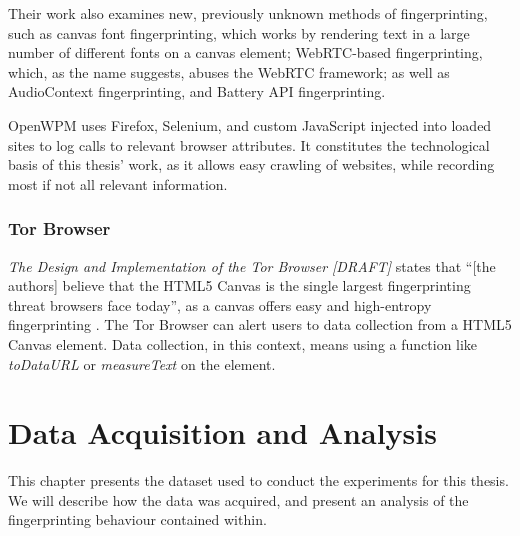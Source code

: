 \documentclass[
    fontsize=12pt,
    headings=small,
    parskip=half,
    bibliography=totoc,
    numbers=noenddot,
    open=any
    ]{scrreprt}
\begin{document}
Their work also examines new, previously unknown methods of fingerprinting, such as canvas font fingerprinting, which
works by rendering text in a large number of different fonts on a canvas element; WebRTC-based fingerprinting, which,
as the name suggests, abuses the WebRTC framework; as well as AudioContext fingerprinting, and Battery API fingerprinting.

OpenWPM uses Firefox, Selenium, and custom JavaScript injected into loaded sites to log calls to relevant browser attributes.
It constitutes the technological basis of this thesis' work, as it allows easy crawling of websites, while recording
most if not all relevant information.


\subsection{Tor Browser}
\label{related_work:tor_browser}
\textit{The Design and Implementation of the Tor Browser [DRAFT]}
states that ``[the authors] believe that the HTML5 Canvas is the single largest fingerprinting threat browsers face today'',
as a canvas offers easy and high-entropy fingerprinting
\cite{acar2014web,mowery2012pixel,torbrowser2018design}.
The Tor Browser can alert users to data collection from a HTML5 Canvas element.
Data collection, in this context, means using a function like \textit{toDataURL} or \textit{measureText} on the element.



\chapter{Data Acquisition and Analysis}
\label{chap:data_acquisition}
This chapter presents the dataset used to conduct the experiments for this thesis.
We will describe how the data was acquired, and present an analysis of the fingerprinting
behaviour contained within.
\end{document}
